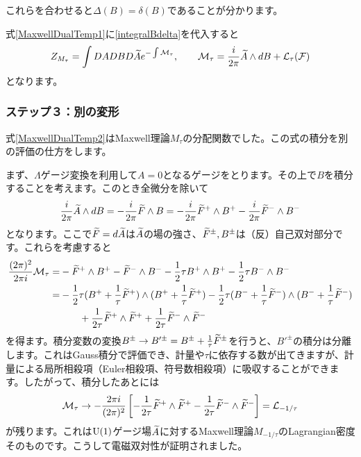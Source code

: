 \documentclass[generalized_symmetry.tex]{subfiles}
\begin{document}
これらを合わせると$\Delta(B)=\delta(B)$であることが分かります。

式\eqref{MaxwellDualTemp1}に\eqref{integralBdelta}を代入すると
\begin{align}
  Z_{M_{\tau}}= \int DA DB D\widetilde{A} e^{-\int \mathcal{M}_{\tau}},\qquad \mathcal{M}_{\tau}=\frac{i}{2\pi}\widetilde{A} \wedge dB+\mathcal{L}_{\tau}(\mathcal{F})\label{MaxwellDualTemp2}
\end{align}
となります。

\subsubsection{ステップ３：別の変形}
式\eqref{MaxwellDualTemp2}はMaxwell理論$M_{\tau}$の分配関数でした。この式の積分を別の評価の仕方をします。

まず、$\Lambda$ゲージ変換を利用して$A=0$となるゲージをとります。その上で$B$を積分することを考えます。このとき全微分を除いて
\begin{align}
  \frac{i}{2\pi}\widetilde{A} \wedge dB=
  -\frac{i}{2\pi}\widetilde{F} \wedge B=
  -\frac{i}{2\pi}\widetilde{F}^{+} \wedge B^{+} -\frac{i}{2\pi}\widetilde{F}^{-} \wedge B^{-}
\end{align}
となります。ここで$\widetilde{F}=d\widetilde{A}$は$\widetilde{A}$の場の強さ、$\widetilde{F}^{\pm},B^{\pm}$は（反）自己双対部分です。これらを考慮すると
\begin{align}
  \frac{(2\pi)^2}{2\pi i}\mathcal{M}_{\tau}=&
  -\widetilde{F}^{+}\wedge B^{+}
  -\widetilde{F}^{-}\wedge B^{-}
  -\frac12 \tau B^{+}\wedge B^{+}
  -\frac12 \tau B^{-}\wedge B^{-}\notag\\
  =&
  -\frac12 \tau 
  (B^{+}+\frac{1}{\tau}\widetilde{F}^{+})\wedge
  (B^{+}+\frac{1}{\tau}\widetilde{F}^{+})
  -\frac12 \tau 
  (B^{-}+\frac{1}{\tau}\widetilde{F}^{-})\wedge
  (B^{-}+\frac{1}{\tau}\widetilde{F}^{-})\notag\\
  &\qquad+\frac{1}{2\tau}\widetilde{F}^{+}\wedge\widetilde{F}^{+}
  +\frac{1}{2\tau}\widetilde{F}^{-}\wedge\widetilde{F}^{-}
\end{align}
を得ます。積分変数の変換$B^{\pm}\to B'^{\pm}=B^{\pm}+\frac{1}{\tau}\widetilde{F}^{\pm}$を行うと、$B'^{\pm}$の積分は分離します。これはGauss積分で評価でき、計量や$\tau$に依存する数が出てきますが、計量による局所相殺項（Euler相殺項、符号数相殺項）に吸収することができます。したがって、積分したあとには
\begin{align}
  \mathcal{M}_{\tau}\to -\frac{2\pi i}{(2\pi)^2}\left[
  -\frac{1}{2\tau}\widetilde{F}^{+}\wedge\widetilde{F}^{+}
  -\frac{1}{2\tau}\widetilde{F}^{-}\wedge\widetilde{F}^{-}
  \right]=\mathcal{L}_{-1/\tau}
\end{align}
が残ります。これは$\mbox{U}(1)$ゲージ場$\widetilde{A}$に対するMaxwell理論$M_{-1/\tau}$のLagrangian密度そのものです。こうして電磁双対性が証明されました。
\end{document}
